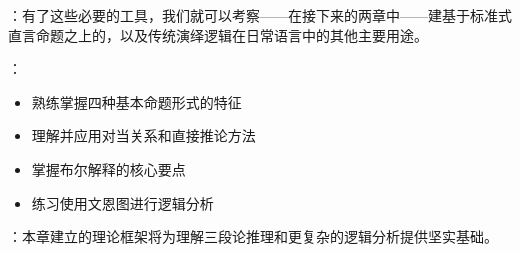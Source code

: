 {\begin{logicbox}[title=承前启后]
：有了这些必要的工具，我们就可以考察——在接下来的两章中——建基于标准式直言命题之上的，以及传统演绎逻辑在日常语言中的其他主要用途。

：
\begin{itemize}
  \item 熟练掌握四种基本命题形式的特征
  \item 理解并应用对当关系和直接推论方法
  \item 掌握布尔解释的核心要点
  \item 练习使用文恩图进行逻辑分析
\end{itemize}

：本章建立的理论框架将为理解三段论推理和更复杂的逻辑分析提供坚实基础。
\end{logicbox}
}

